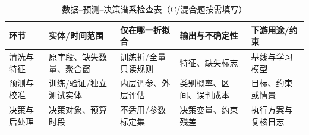 \documentclass[withoutpreface,bwprint]{cumcmthesis}
\newif\ifmcmguidance
\begin{document}
\ifmcmguidance
  \begin{table}[H]
    \centering
    \small
    \caption{数据--预测--决策谱系检查表（C/混合题按需填写）}
    \label{tab:data-decision-lineage-guide}
    \begin{tabular}{p{2.0cm}p{2.6cm}p{2.7cm}p{2.5cm}p{2.7cm}}
      \toprule
      环节 & 实体/时间范围 & 仅在哪一折拟合 & 输出与不确定性 & 下游用途/约束 \\
      \midrule
      清洗与特征 & 原字段、缺失数量、聚合窗 & 训练折/全量只读规则 & 特征、缺失标志 & 基线与学习模型 \\
      预测与校准 & 训练/验证/独立测试实体 & 内层调参、外层评估 & 类别概率、区间、误判成本 & 目标、约束或情景 \\
      决策与后处理 & 决策对象、预算时段 & 不适用/参数标定集 & 决策变量、约束残差 & 执行方案与复核日志 \\
      \bottomrule
    \end{tabular}
  \end{table}
\end{document}
